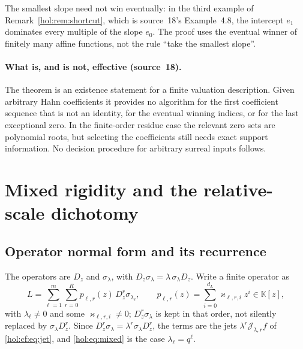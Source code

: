 \documentclass[11pt]{article}
\numberwithin{equation}{section}
\theoremstyle{definition}
\theoremstyle{remark}
\newcommand{\KK}{\mathbb K}
\newcommand{\jet}[2]{\mathcal J_{#1,#2}}
\begin{document}
The smallest slope need not win eventually: in the third example of
Remark~\ref{hol:rem:shortcut}, which is source~18's Example~4.8, the intercept
$e_1$ dominates every multiple of the slope $e_0$. The proof uses the eventual
winner of finitely many affine functions, not the rule ``take the smallest
slope''.

\paragraph{What is, and is not, effective (source~18).}
The theorem is an existence statement for a finite valuation description.
Given arbitrary Hahn coefficients it provides no algorithm for the first
coefficient sequence that is not an identity, for the eventual winning
indices, or for the last exceptional zero. In the finite-order residue case
the relevant zero sets are polynomial roots, but selecting the coefficients
still needs exact support information. No decision procedure for arbitrary
surreal inputs follows.

\section{Mixed rigidity and the relative-scale dichotomy}
\label{hol:ud:sec:mixed}

\subsection{Operator normal form and its recurrence}
\label{hol:ud:sub:operator}

The operators are $D_z$ and $\sigma_\lambda$, with
$D_z\sigma_\lambda=\lambda\,\sigma_\lambda D_z$. Write a finite operator as
\begin{equation}\label{hol:ud:eq:L}
 L=\sum_{\ell=1}^m\sum_{r=0}^{R}p_{\ell,r}(z)\,D_z^r\sigma_{\lambda_\ell},\qquad
 p_{\ell,r}(z)=\sum_{i=0}^{d_L}\varkappa_{\ell,r,i}z^i\in\KK[z],
\end{equation}
with $\lambda_\ell\ne0$ and some $\varkappa_{\ell,r,i}\ne0$; $D_z^r\sigma_\lambda$
is kept in that order, not silently replaced by $\sigma_\lambda D_z^r$. Since
$D_z^r\sigma_\lambda=\lambda^r\sigma_\lambda D_z^r$, the terms are the jets
$\lambda^r\jet\lambda rf$ of \eqref{hol:cf:eq:jet}, and \eqref{hol:eq:mixed} is
the case $\lambda_\ell=q^\ell$.
\end{document}
